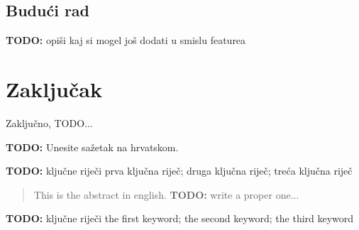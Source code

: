 \documentclass[zavrsnirad]{fer}
\begin{document}
\pagebreak
\section{Budući rad}
\textbf{TODO:} opiši kaj si mogel još dodati u smislu featurea
\cite{123DCatch}
\blindtext


\chapter{Zaključak}
\label{pog:zakljucak}

Zaključno, TODO...
\blindtext








\begin{sazetak}
  \textbf{TODO:} Unesite sažetak na hrvatskom.
  \blindtext
\end{sazetak}

\begin{kljucnerijeci}
  \textbf{TODO:} ključne riječi
  prva ključna riječ; druga ključna riječ; treća ključna riječ
\end{kljucnerijeci}


\begin{abstract}
  This is the abstract in english. \textbf{TODO:} write a proper one...
  \blindtext
\end{abstract}

\begin{keywords}
  \textbf{TODO:} ključne riječi
  the first keyword; the second keyword; the third keyword
\end{keywords}



\backmatter
\end{document}
